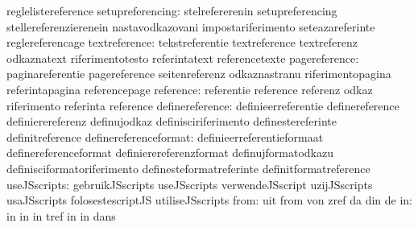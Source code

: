                                   reglelistereference
                setupreferencing: stelrefererenin                  setupreferencing
                                  stellereferenzierenein           nastavodkazovani
                                  impostariferimento               seteazareferinte
                                  reglereferencage
                   textreference: tekstreferentie                  textreference
                                  textreferenz                     odkaznatext
                                  riferimentotesto                 referintatext
                                  referencetexte
                   pagereference: paginareferentie                 pagereference
                                  seitenreferenz                   odkaznastranu
                                  riferimentopagina                referintapagina
                                  referencepage
                       reference: referentie                       reference
                                  referenz                         odkaz
                                  riferimento                      referinta
                                  reference
                 definereference: definieerreferentie              definereference
                                  definierereferenz                definujodkaz
                                  definisciriferimento             definestereferinte
                                  definitreference
           definereferenceformat: definieerreferentieformaat       definereferenceformat
                                  definierereferenzformat          definujformatodkazu
                                  definisciformatoriferimento      definesteformatreferinte
                                  definitformatreference
                    useJSscripts: gebruikJSscripts                 useJSscripts
                                  verwendeJSscript                 uzijJSscripts
                                  usaJSscripts                     folosestescriptJS
                                  utiliseJSscripts
                            from: uit                              from
                                  von                              zref
                                  da                               din
                                  de
                              in: in                               in
                                  in                               tref
                                  in                               in
                                  dans
